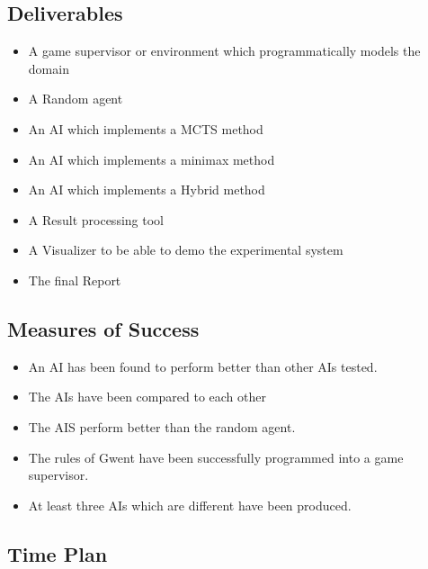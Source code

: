 \documentclass [11pt]{article}
\begin{document}
	\subsection{Deliverables}
	\begin{itemize}
		\item A game supervisor or environment which programmatically models the domain
		\item A Random agent
		\item An AI which implements a MCTS method 
		\item An AI which implements a minimax method
		\item An AI which implements a Hybrid method
		\item A Result processing tool
		\item A Visualizer to be able to demo the experimental system
		\item The final Report
	\end{itemize}
	
	\subsection{Measures of Success}
	\begin{itemize}
		\item An AI has been found to perform better than other AIs tested.
		\item The AIs have been compared to each other
		\item The AIS perform better than the random agent.
		\item The rules of Gwent have been successfully programmed into a game supervisor.
		\item At least three AIs which are different have been produced.
	\end{itemize}
	
	\subsection{Time Plan}
	
\end{document}
